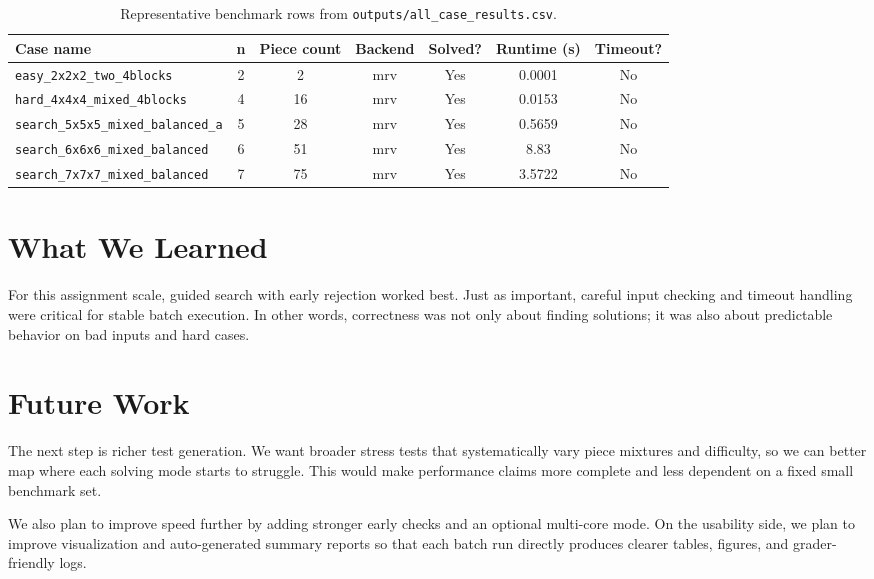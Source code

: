 \documentclass[11pt]{article}
\begin{document}
\begin{table}[h]
\centering
\scriptsize
\begin{tabular}{|p{4.3cm}|c|c|c|c|c|c|}
\hline
Case name & n & Piece count & Backend & Solved? & Runtime (s) & Timeout? \\
\hline
\texttt{easy\_2x2x2\_two\_4blocks} & 2 & 2 & mrv & Yes & 0.0001 & No \\
\hline
\texttt{hard\_4x4x4\_mixed\_4blocks} & 4 & 16 & mrv & Yes & 0.0153 & No \\
\hline
\texttt{search\_5x5x5\_mixed\_balanced\_a} & 5 & 28 & mrv & Yes & 0.5659 & No \\
\hline
\texttt{search\_6x6x6\_mixed\_balanced} & 6 & 51 & mrv & Yes & 8.83 & No \\
\hline
\texttt{search\_7x7x7\_mixed\_balanced} & 7 & 75 & mrv & Yes & 3.5722 & No \\
\hline
\end{tabular}
\caption{Representative benchmark rows from \texttt{outputs/all\_case\_results.csv}.}
\end{table}

\section*{What We Learned}
For this assignment scale, guided search with early rejection worked best. Just as important, careful input checking and timeout handling were critical for stable batch execution. In other words, correctness was not only about finding solutions; it was also about predictable behavior on bad inputs and hard cases.

\section*{Future Work}
The next step is richer test generation. We want broader stress tests that systematically vary piece mixtures and difficulty, so we can better map where each solving mode starts to struggle. This would make performance claims more complete and less dependent on a fixed small benchmark set.

We also plan to improve speed further by adding stronger early checks and an optional multi-core mode. On the usability side, we plan to improve visualization and auto-generated summary reports so that each batch run directly produces clearer tables, figures, and grader-friendly logs.
\end{document}
